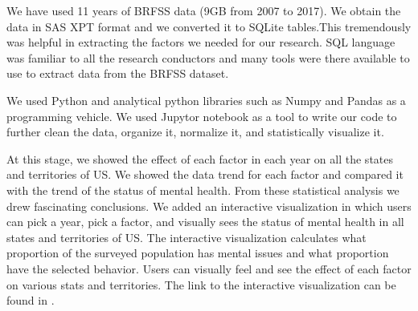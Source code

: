 \documentclass[letterpaper, 10 pt, conference]{ieeeconf}  %
\begin{document}



We have used 11 years of BRFSS data (9GB from 2007 to 2017). We obtain the data in
SAS \cite{sas} XPT format and we converted it to SQLite \cite{sqlite} tables.This tremendously was helpful 
in extracting the factors we needed for our research. SQL language was familiar to all the research conductors 
and many tools were there available to use to extract data from the BRFSS dataset.

We used Python and analytical python libraries such as Numpy \cite{numpy} and Pandas \cite{pandas}
as a programming vehicle. We used Jupytor notebook as a tool to write our code to further clean the data,
organize it, normalize it, and statistically visualize it. 

At this stage, we showed the effect of each factor in each year on all the states and territories of US. We showed the data trend for each factor and 
compared it with the trend of the status of mental health. From these statistical analysis we drew fascinating conclusions. 
We added an interactive visualization in which users can pick a year, pick a factor, and 
visually sees the status of mental health in all states and territories of US. The interactive visualization calculates what proportion 
of the surveyed population has mental issues and what proportion have the selected behavior. Users can visually 
feel and see the effect of each factor on various stats and territories. The link to the interactive visualization can be found in \cite{visualization}.
\end{document}

